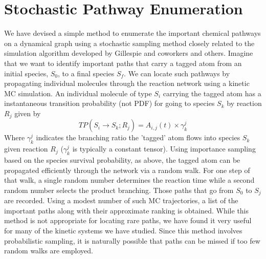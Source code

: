 \section{Stochastic Pathway Enumeration}
\label{ch2:sec:Stochastic_pathway_enumeration}
We have devised a simple method to enumerate the important chemical pathways on a
dynamical graph using a stochastic sampling method closely related to the simulation
algorithm developed by Gillespie and coworkers\cite{ch1_IRPC_36_gillespie2013perspective} and others\cite{ch1_IRPC_46_tosatto2013simplifying}. Imagine that we
want to identify important paths that carry a tagged atom from an initial species, $S_0$, to
a final species $S_f$. We can locate such pathways by propagating individual molecules
through the reaction network using a kinetic MC simulation. An individual molecule of
type $S_i$ carrying the tagged atom has a instantaneous transition probability (not PDF) for going to species
$S_k$ by reaction $R_j$ given by
\begin{equation}
\label{ch2:eqn23}
TP\left(  S_i \xrightarrow[]{} S_k; R_j \right) = A_{i,j}(t) \times \gamma_k^j
\end{equation}
Where $\gamma_k^j$ indicates the branching ratio the 'tagged' atom flows into species $S_k$ given reaction $R_j$ ($\gamma_k^j$ is typically a constant tensor). Using importance sampling based on the species survival probability, as above, the
tagged atom can be propagated efficiently through the network via a random walk. For
one step of that walk, a single random number determines the reaction time while a
second random number selects the product branching. Those paths that go from $S_0$ to
$S_j$ are recorded. Using a modest number of such MC trajectories, a list of the important
paths along with their approximate ranking is obtained. While this method is not appropriate
for locating rare paths, we have found it very useful for many of the kinetic systems
we have studied. Since this method involves probabilistic sampling, it is naturally
possible that paths can be missed if too few random walks are employed.